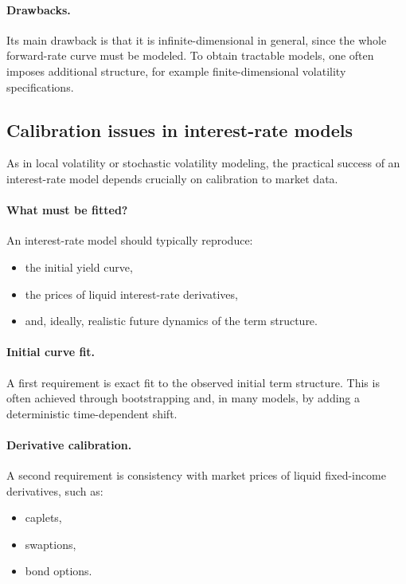 \documentclass[11pt]{article}
\theoremstyle{plain}
\theoremstyle{definition}
\theoremstyle{remark}
\begin{document}
\paragraph{Drawbacks.}
Its main drawback is that it is infinite-dimensional in general, since
the whole forward-rate curve must be modeled.
To obtain tractable models, one often imposes additional structure,
for example finite-dimensional volatility specifications.

\subsection{Calibration issues in interest-rate models}

As in local volatility or stochastic volatility modeling, the practical
success of an interest-rate model depends crucially on calibration to
market data.

\paragraph{What must be fitted?}
An interest-rate model should typically reproduce:
\begin{itemize}[leftmargin=1.4em]
    \item the initial yield curve,
    \item the prices of liquid interest-rate derivatives,
    \item and, ideally, realistic future dynamics of the term structure.
\end{itemize}

\paragraph{Initial curve fit.}
A first requirement is exact fit to the observed initial term structure.
This is often achieved through bootstrapping and, in many models, by
adding a deterministic time-dependent shift.

\paragraph{Derivative calibration.}
A second requirement is consistency with market prices of liquid
fixed-income derivatives, such as:
\begin{itemize}[leftmargin=1.4em]
    \item caplets,
    \item swaptions,
    \item bond options.
\end{itemize}
\end{document}
